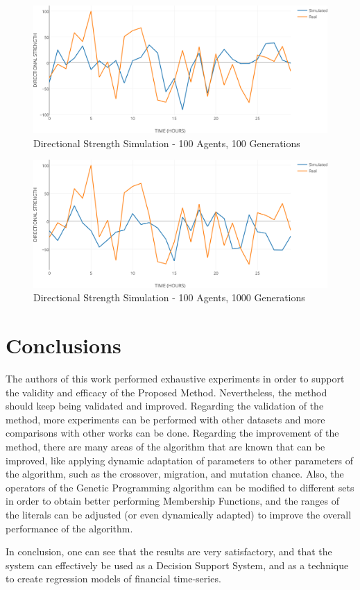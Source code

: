 \documentclass[12pt,journal,draftcls,onecolumn]{IEEEtran}
\begin{document}
\begin{figure}[htp]
\caption{Directional Strength Simulation - 100 Agents, 100
  Generations}
\label{ds-prediction-100}
\begin{center}
\includegraphics[width=1\columnwidth]{figures/ds-sim-100agents-100gen/ds-sim-100agents-100gen.png}
\end{center}
\end{figure}

\begin{figure}[htp]
\caption{Directional Strength Simulation - 100 Agents, 1000
  Generations}
\label{ds-prediction-1000}
\begin{center}
\includegraphics[width=1\columnwidth]{figures/ds-sim-100agents-1000gen/ds-sim-100agents-1000gen.png}
\end{center}
\end{figure}

\section{Conclusions}
\label{conclusions}

The authors of this work performed exhaustive experiments in order to
support the validity and efficacy of the Proposed
Method. Nevertheless, the method should keep being validated and
improved. Regarding the validation of the method, more experiments can
be performed with other datasets and more comparisons with other works
can be done. Regarding the improvement of the method, there are many
areas of the algorithm that are known that can be improved, like
applying dynamic adaptation of parameters to other parameters of the
algorithm, such as the crossover, migration, and mutation
chance. Also, the operators of the Genetic Programming algorithm can
be modified to different sets in order to obtain better performing
Membership Functions, and the ranges of the literals can be adjusted
(or even dynamically adapted) to  improve the overall performance of
the algorithm.

In conclusion, one can see that the results are very satisfactory, and
that the system can effectively be used as a Decision Support System,
and as a technique to create regression models of financial
time-series.
  


\end{document}
